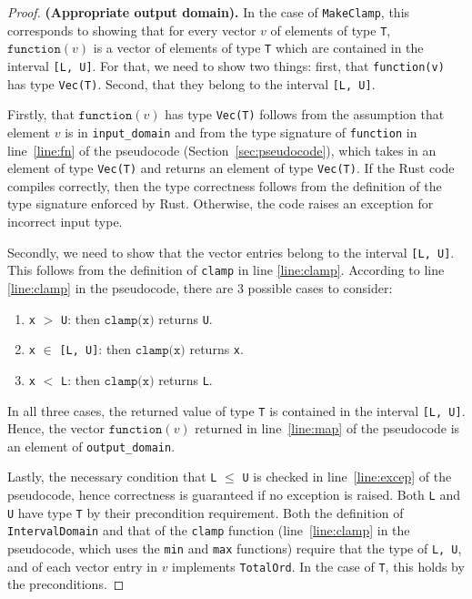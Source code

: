 \documentclass[11pt,a4paper]{article}
\theoremstyle{definition}
\newcommand{\T}{\texttt{T} }
\newcommand{\clamp}{\texttt{clamp}}
\newcommand{\function}{\texttt{function}}
\begin{document}
\begin{proof}
\textbf{(Appropriate output domain).} In the case of \texttt{MakeClamp}, this corresponds to showing that for every vector $v$ of elements of type \texttt{T}, $\function(v)$ is a vector of elements of type \texttt{T} which are contained in the interval \texttt{[L, U]}. For that, we need to show two things: first, that \texttt{function(v)} has type \texttt{Vec(T)}. %
Second, that they belong to the interval \texttt{[L, U]}.

Firstly, that $\function(v)$ has type \texttt{Vec(T)} follows from the assumption that element $v$ is in \texttt{input\_domain} and from the type signature of \texttt{function} in line~\ref{line:fn} of the pseudocode (Section~\ref{sec:pseudocode}), which takes in an element of type \texttt{Vec(T)} and returns an element of type \texttt{Vec(T)}. If the Rust code compiles correctly, then the type correctness follows from the definition of the type signature enforced by Rust. Otherwise, the code raises an exception for incorrect input type. 

Secondly, we need to show that the vector entries belong to the interval \texttt{[L, U]}. This follows from the definition of \texttt{clamp} in line \ref{line:clamp}. According to line \ref{line:clamp} in the pseudocode, there are 3 possible cases to consider:
\begin{enumerate}
    \item \texttt{x} $>$ \texttt{U}: then $\clamp\texttt{(x)}$ returns \texttt{U}.
    \item \texttt{x} $\in$ \texttt{[L, U]}: then $\clamp\texttt{(x)}$ returns \texttt{x}.
    \item \texttt{x} $<$ \texttt{L}: then $\clamp\texttt{(x)}$ returns \texttt{L}.
\end{enumerate}
In all three cases, the returned value of type \T is contained in the interval \texttt{[L, U]}. Hence, the vector $\function(v)$ returned in line~\ref{line:map} of the pseudocode is an element of \texttt{output\_domain}.

Lastly, the necessary condition that \texttt{L} $\leq$ \texttt{U} is checked in line~\ref{line:excep} of the pseudocode, hence correctness is guaranteed if no exception is raised. Both \texttt{L} and \texttt{U} have type \texttt{T} by their precondition requirement. Both the definition of \texttt{IntervalDomain} and that of the \texttt{clamp} function (line~\ref{line:clamp} in the pseudocode, which uses the \texttt{min} and \texttt{max} functions) require that the type of \texttt{L, U}, and of each vector entry in $v$ implements \texttt{TotalOrd}. In the case of \texttt{T}, this holds by the preconditions.


\end{proof}
\end{document}
